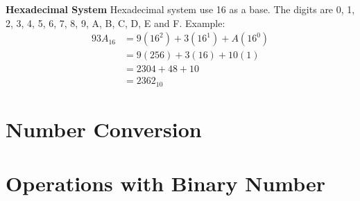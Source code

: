 \noindent\large\textbf{Hexadecimal System}\newline
\normalsize Hexadecimal system use 16 as a base. The digits are 0, 1, 2, 3, 4, 5, 6, 7, 8, 9, A, B, C, D, E and F. Example:
\begin{equation} \label{eq3}
\begin{split}
93A_{16} & = 9(16^2)+3(16^1)+A(16^0) \\
& = 9(256)+3(16)+10(1) \\
& = 2304+48+10 \\
& = 2362_{10}
\end{split}
\end{equation} 

\section{Number Conversion}

\section{Operations with Binary Number}